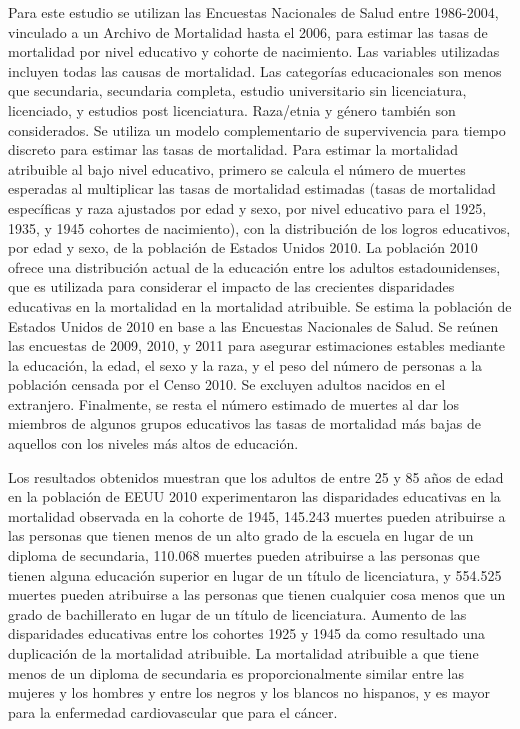 Para este estudio se utilizan las Encuestas Nacionales de Salud entre 1986-2004, vinculado a un Archivo de Mortalidad hasta el 2006, para estimar las tasas de mortalidad por nivel educativo y cohorte de nacimiento.
Las variables utilizadas incluyen todas las causas de mortalidad. Las categorías educacionales son menos que secundaria, secundaria completa, estudio universitario sin licenciatura, licenciado, y estudios post licenciatura. Raza/etnia y género también son considerados. 
Se utiliza un modelo complementario de supervivencia para tiempo discreto para estimar las tasas de mortalidad. 
Para estimar la mortalidad atribuible al bajo nivel educativo, primero se calcula el número de muertes esperadas al multiplicar las tasas de mortalidad estimadas (tasas de mortalidad específicas y raza ajustados por edad y sexo, por nivel educativo para el 1925, 1935, y 1945 cohortes de nacimiento), con la distribución de los logros educativos, por edad y sexo, de la población de Estados Unidos 2010. La población 2010 ofrece una distribución actual de la educación entre los adultos estadounidenses, que es utilizada para considerar el impacto de las crecientes disparidades educativas en la mortalidad en la mortalidad atribuible. Se estima la población de Estados Unidos de 2010 en base a las Encuestas Nacionales de Salud. Se reúnen las encuestas de 2009, 2010, y 2011 para asegurar estimaciones estables mediante la educación, la edad, el sexo y la raza, y el peso del número de personas a la población censada por el Censo 2010. Se excluyen adultos nacidos en el extranjero. Finalmente, se resta el número estimado de muertes al dar los miembros de algunos grupos educativos las tasas de mortalidad más bajas de aquellos con los niveles más altos de educación.

Los resultados obtenidos muestran que los adultos de entre 25 y 85 años de edad en la población de EEUU 2010 experimentaron las disparidades educativas en la mortalidad observada en la cohorte de 1945, 145.243 muertes pueden atribuirse a las personas que tienen menos de un alto grado de la escuela en lugar de un diploma de secundaria, 110.068 muertes pueden atribuirse a las personas que tienen alguna educación superior en lugar de un título de licenciatura, y 554.525 muertes pueden atribuirse a las personas que tienen cualquier cosa menos que un grado de bachillerato en lugar de un título de licenciatura. Aumento de las disparidades educativas entre los cohortes 1925 y 1945 da como resultado una duplicación de la mortalidad atribuible. La mortalidad atribuible a que tiene menos de un diploma de secundaria es proporcionalmente similar entre las mujeres y los hombres y entre los negros y los blancos no hispanos, y es mayor para la enfermedad cardiovascular que para el cáncer.

